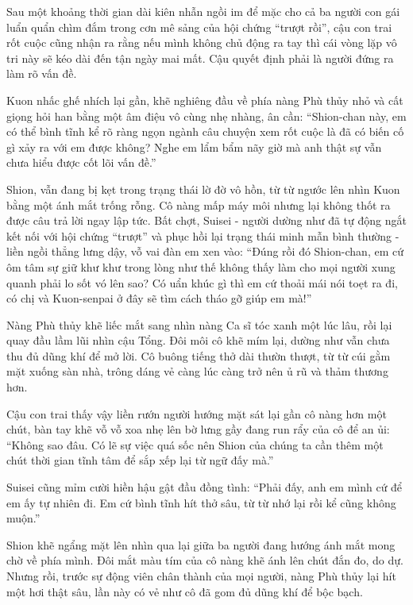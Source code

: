 \documentclass[../main.tex]{subfiles}
\begin{document}
\omk

Sau một khoảng thời gian dài kiên nhẫn ngồi im để mặc cho cả ba người con gái luẩn quẩn chìm đắm trong cơn mê sảng của hội chứng ``trượt rồi'', cậu con trai rốt cuộc cũng nhận ra rằng nếu mình không chủ động ra tay thì cái vòng lặp vô tri này sẽ kéo dài đến tận ngày mai mất. Cậu quyết định phải là người đứng ra làm rõ vấn đề.

Kuon nhấc ghế nhích lại gần, khẽ nghiêng đầu về phía nàng Phù thủy nhỏ và cất giọng hỏi han bằng một âm điệu vô cùng nhẹ nhàng, ân cần: ``Shion-chan này, em có thể bình tĩnh kể rõ ràng ngọn ngành câu chuyện xem rốt cuộc là đã có biến cố gì xảy ra với em được không? Nghe em lẩm bẩm nãy giờ mà anh thật sự vẫn chưa hiểu được cốt lõi vấn đề.''

Shion, vẫn đang bị kẹt trong trạng thái lờ đờ vô hồn, từ từ ngước lên nhìn Kuon bằng một ánh mắt trống rỗng. Cô nàng mấp máy môi nhưng lại không thốt ra được câu trả lời ngay lập tức. Bất chợt, Suisei -  người dường như đã tự động ngắt kết nối với hội chứng ``trượt'' và phục hồi lại trạng thái minh mẫn bình thường -  liền ngồi thẳng lưng dậy, vỗ vai đàn em xen vào: ``Đúng rồi đó Shion-chan, em cứ ôm tâm sự giữ khư khư trong lòng như thế không thấy làm cho mọi người xung quanh phải lo sốt vó lên sao? Có uẩn khúc gì thì em cứ thoải mái nói toẹt ra đi, có chị và Kuon-senpai ở đây sẽ tìm cách tháo gỡ giúp em mà!''

Nàng Phù thủy khẽ liếc mắt sang nhìn nàng Ca sĩ tóc xanh một lúc lâu, rồi lại quay đầu lầm lũi nhìn cậu Tổng. Đôi môi cô khẽ mím lại, dường như vẫn chưa thu đủ dũng khí để mở lời. Cô buông tiếng thở dài thườn thượt, từ từ cúi gằm mặt xuống sàn nhà, trông dáng vẻ càng lúc càng trở nên ủ rũ và thảm thương hơn.

Cậu con trai thấy vậy liền rướn người hướng mặt sát lại gần cô nàng hơn một chút, bàn tay khẽ vỗ vỗ xoa nhẹ lên bờ lưng gầy đang run rẩy của cô để an ủi: ``Không sao đâu. Có lẽ sự việc quá sốc nên Shion của chúng ta cần thêm một chút thời gian tĩnh tâm để sắp xếp lại từ ngữ đấy mà.''

Suisei cũng mỉm cười hiền hậu gật đầu đồng tình: ``Phải đấy, anh em mình cứ để em ấy tự nhiên đi. Em cứ bình tĩnh hít thở sâu, từ từ nhớ lại rồi kể cũng không muộn.''

Shion khẽ ngẩng mặt lên nhìn qua lại giữa ba người đang hướng ánh mắt mong chờ về phía mình. Đôi mắt màu tím của cô nàng khẽ ánh lên chút đắn đo, do dự. Nhưng rồi, trước sự động viên chân thành của mọi người, nàng Phù thủy lại hít một hơi thật sâu, lần này có vẻ như cô đã gom đủ dũng khí để bộc bạch.
\end{document}
